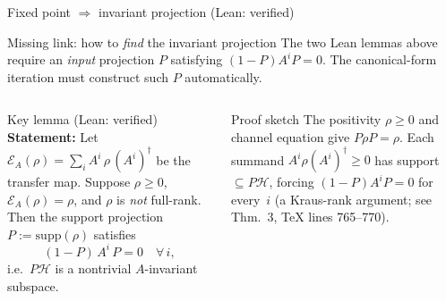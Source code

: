 \documentclass[aspectratio=169,10pt]{beamer}
\begin{document}
\begin{frame}{Fixed point $\Rightarrow$ invariant projection (Lean: verified)}
    \vspace{-0.5em}

    \begin{block}{Missing link: how to \emph{find} the invariant projection}
        The two Lean lemmas above require an \emph{input} projection $P$
        satisfying $(1{-}P)A^i P = 0$.
        The canonical-form iteration must \alert{construct} such $P$ automatically.
    \end{block}

    \begin{columns}[T]
        \begin{block}{Key lemma (Lean: verified)}
            \textbf{Statement:}
            Let $\mathcal{E}_A(\rho) = \sum_i A^i\,\rho\,(A^i)^\dagger$ be the transfer map.
            Suppose $\rho \ge 0$, $\mathcal{E}_A(\rho) = \rho$, and $\rho$ is
            \emph{not} full-rank. Then the support projection
            $P := \mathrm{supp}(\rho)$ satisfies
            \[
                (1 - P)\,A^i\,P = 0 \quad \forall\,i,
            \]
            i.e.\ $P\mathcal{H}$ is a nontrivial $A$-invariant subspace.
        \end{block}

        \begin{block}{Proof sketch}
            The positivity $\rho \ge 0$ and channel equation give
            $P\rho P = \rho$.
            Each summand $A^i\rho(A^i)^\dagger \ge 0$ has support $\subseteq P\mathcal{H}$,
            forcing $(1{-}P)A^i P = 0$ for every~$i$
            (a Kraus-rank argument; see~\cite{Perez-Garcia2007Matrix} Thm.~3,
            TeX lines 765--770).
        \end{block}


\end{columns}
\end{frame}
\end{document}
